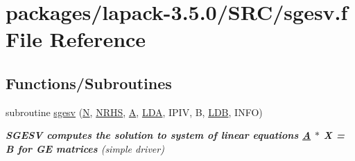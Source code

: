 \hypertarget{sgesv_8f}{}\section{packages/lapack-\/3.5.0/\+S\+R\+C/sgesv.f File Reference}
\label{sgesv_8f}
\subsection*{Functions/\+Subroutines}
\begin{DoxyCompactItemize}
\item 
subroutine \hyperlink{group__realGEsolve_ga3b05fb3999b3d7351cb3101a1fd28e78}{sgesv} (\hyperlink{polmisc_8c_a0240ac851181b84ac374872dc5434ee4}{N}, \hyperlink{example__user_8c_aa0138da002ce2a90360df2f521eb3198}{N\+R\+H\+S}, \hyperlink{classA}{A}, \hyperlink{example__user_8c_ae946da542ce0db94dced19b2ecefd1aa}{L\+D\+A}, I\+P\+I\+V, B, \hyperlink{example__user_8c_a50e90a7104df172b5a89a06c47fcca04}{L\+D\+B}, I\+N\+F\+O)
\begin{DoxyCompactList}\small\item\em {\bfseries  S\+G\+E\+S\+V computes the solution to system of linear equations \hyperlink{classA}{A} $\ast$ X = B for G\+E matrices} (simple driver) \end{DoxyCompactList}\end{DoxyCompactItemize}

